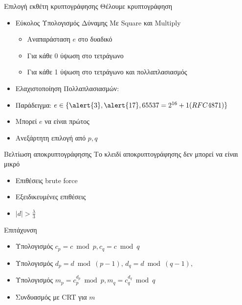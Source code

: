 \documentclass[handout]{beamer}
\begin{document}
\begin{frame}{Επιλογή εκθέτη κρυπτογράφησης}
Θέλουμε  κρυπτογράφηση
\begin{itemize}
	\item Εύκολος Υπολογισμός Δύναμης Με Square και Multiply
	\pause
	\begin{itemize}
		\item Αναπαράσταση $e$ στο δυαδικό
		\item Για κάθε 0 ύψωση στο τετράγωνο
		\item Για κάθε 1 ύψωση στο τετράγωνο και πολλαπλασιασμός
	\end{itemize}
	\pause
	\item Ελαχιστοποίηση Πολλαπλασιασμών: 	
	\item Παράδειγμα: $e \in \{ \alert{3},\alert{17},65537=2^{16}+1(RFC4871)\}$
	\item Μπορεί $e$ να είναι πρώτος
	\item Ανεξάρτητη επιλογή από $p,q$
\end{itemize}
\end{frame}

\begin{frame}{Βελτίωση αποκρυπτογράφησης}
\alert{Το κλειδί αποκρυπτογράφησης δεν μπορεί να είναι μικρό}
\begin{itemize}
\item Επιθέσεις brute force
\item Εξειδικευμένες επιθέσεις
\item $|d| > \frac{\lambda}{3}$
\end{itemize}
\pause
\begin{block}{Επιτάχυνση}
\begin{itemize}
\item Υπολογισμός $c_p = c \bmod p, c_q = c \bmod q$
\item Υπολογισμός $d_p = d \bmod ({p-1}), \, d_q = d \bmod ({q-1}), $  
\item Υπολογισμός $m_p = c_p^{d_p} \bmod {p}, m_q = c_q^{d_q} \bmod {q} $ 
\item Συνδυασμός με CRT για $m$ 
\end{itemize}
\end{block}
\end{frame}
\end{document}
